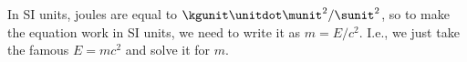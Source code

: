 In SI units, joules are equal to $\kgunit\unitdot\munit^2/\sunit^2$, so to make the
equation work in SI units, we need to write it as $m=E/c^2$. I.e., we just take the
famous $E=mc^2$ and solve it for $m$.
